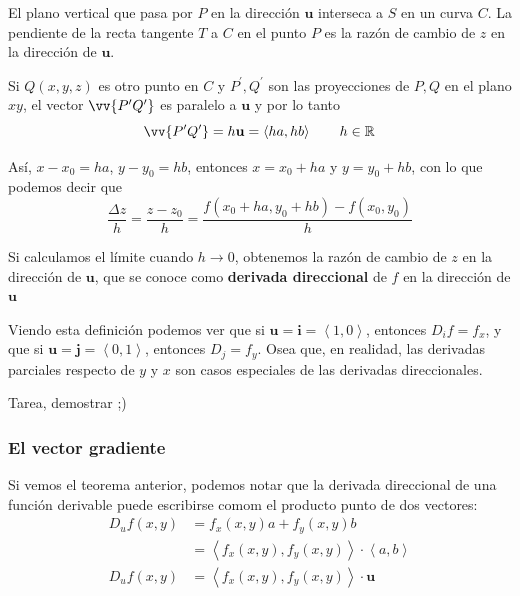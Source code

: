 \documentclass[12pt]{article}
\begin{document}
El plano vertical que pasa por $ P $ en la dirección $ \mathbf{u} $ interseca a $ S $ en un curva $ C $. La pendiente de la recta tangente $ T $ a $ C $ en el punto $ P $ es la razón de cambio de $ z $ en la dirección de $ \mathbf{u} $.

Si $ Q(x,y,z) $ es otro punto en $ C $ y $ P^{\prime}, Q^{\prime} $ son las proyecciones de $ P, Q $ en el plano $ xy $, el vector $ \vv{P^{\prime}Q^{\prime}} $ es paralelo a $ \mathbf{u} $ y por lo tanto
\[
\vv{P^{\prime}Q^{\prime}}=h\mathbf{u}=\left\langle ha,hb \right\rangle \qquad h \in \mathbb{R}^{}
\]

Así, $ x-x_{0}=ha $, $ y-y_{0}=hb $, entonces $ x=x_{0}+ha $ y $ y=y_{0}+hb $, con lo que podemos decir que
\[
	\frac{\Delta z}{h} = \frac{z-z_{0}}{h} = \frac{f(x_{0}+ha,y_{0}+hb)-f(x_{0},y_{0})}{h}
\]

Si calculamos el límite cuando $ h \to 0 $, obtenemos la razón de cambio de $ z $ en la dirección de $ \mathbf{u} $, que se conoce como \textbf{derivada direccional} de $ f $ en la dirección de $ \mathbf{u} $

\vspace{0.2cm}
\vspace{0.2cm}

Viendo esta definición podemos ver que si $ \mathbf{u}=\mathbf{i}=\left\langle 1,0 \right\rangle $, entonces $ D_{i}f=f_{x} $, y que si $ \mathbf{u}=\mathbf{j}=\left\langle 0,1 \right\rangle $, entonces $ D_{j}=f_{y} $. Osea que, en realidad, las derivadas parciales respecto de $ y $ y $ x $ son casos especiales de las derivadas direccionales.

\vspace{0.2cm}
\vspace{0.2cm}

Tarea, demostrar ;)

\subsubsection{El vector gradiente}
Si vemos el teorema anterior, podemos notar que la derivada direccional de una función derivable puede escribirse comom el producto punto de dos vectores:
\begin{align*}
  D_{u}f(x,y) &= f_{x}(x,y)a+f_{y}(x,y)b\\
   &= \left\langle f_{x}(x,y),f_{y}(x,y) \right\rangle\cdot \left\langle a,b \right\rangle\\
  D_{u}f(x,y) &= \left\langle f_{x}(x,y),f_{y}(x,y) \right\rangle\cdot \mathbf{u}
\end{align*}
\end{document}
